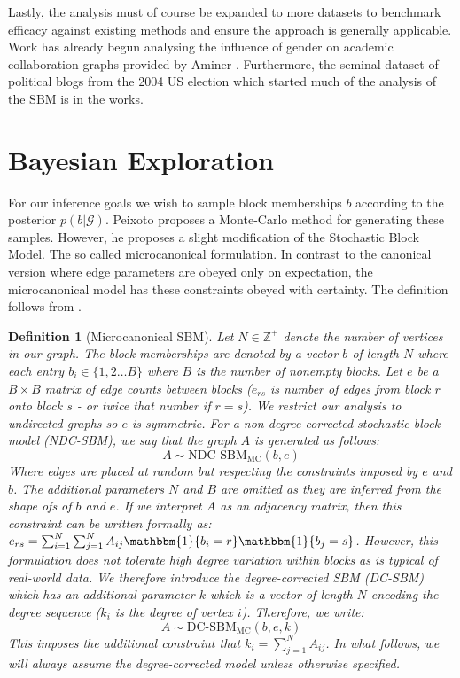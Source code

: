 \documentclass[]{article}
\newcommand{\Gcal}{\mathcal{G}}
\newcommand{\Integers}{\mathbb{Z}}
\newcommand{\one}{\mathbbm{1}}
\newtheorem{definition}{Definition}[section]
\begin{document}
\begin{multicols*}{2}
Lastly, the analysis must of course be expanded to more datasets to benchmark efficacy against existing methods and ensure the approach is generally applicable. Work has already begun analysing the influence of gender on academic collaboration graphs provided by Aminer \cite{aminer}. Furthermore, the seminal dataset of political blogs from the 2004 US election \cite{polblogs} which started much of the analysis of the SBM is in the works.

\section{Bayesian Exploration}

For our inference goals we wish to sample block memberships $b$ according to the posterior $p(b | \Gcal)$. Peixoto \cite{Peixoto-MCMC} proposes a Monte-Carlo method for generating these samples. However, he proposes a slight modification of the Stochastic Block Model. The so called microcanonical formulation. In contrast to the canonical version where edge parameters are obeyed only on expectation, the microcanonical model has these constraints obeyed with certainty. The definition follows from \cite{Peixoto-Bayesian-Microcanonical}.

\begin{definition}[Microcanonical SBM]
	\label{defn:microcan-sbm}
	Let $N \in \Integers^{+}$ denote the number of vertices in our graph. The block memberships are denoted by a vector $b$ of length $N$ where each entry $b_i \in \{1, 2 \dots B\}$ where $B$ is the number of nonempty blocks. Let $e$ be a $B \times B$ matrix of edge counts between blocks ($e_{rs}$ is number of edges from block $r$ onto block $s$ - or twice that number if $r=s$). We restrict our analysis to undirected graphs so $e$ is symmetric. For a non-degree-corrected stochastic block model (NDC-SBM), we say that the graph $A$ is generated as follows:
	\begin{equation}
		A \sim \textrm{NDC-SBM}_{\textrm{MC}} (b, e)
	\end{equation}
	Where edges are placed at random but respecting the constraints imposed by $e$ and $b$. The additional parameters $N$ and $B$ are omitted as they are inferred from the shape ofs of $b$ and $e$. If we interpret $A$ as an adjacency matrix, then this constraint can be written formally as: $e_{rs} = \sum_{i=1}^{N} \sum_{j=1}^{N} A_{ij} \one \{b_i = r\} \one \{b_j = s\}$. However, this formulation does not tolerate high degree variation within blocks as is typical of real-world data. We therefore introduce the degree-corrected SBM (DC-SBM) which has an additional parameter $k$ which is a vector of length $N$ encoding the degree sequence ($k_i$ is the degree of vertex $i$). Therefore, we write:
	\begin{equation}
		A \sim \textrm{DC-SBM}_{\textrm{MC}} (b, e, k)
	\end{equation}
	This imposes the additional constraint that $k_i = \sum_{j=1}^{N} A_{ij}$. In what follows, we will always assume the degree-corrected model unless otherwise specified.
	

\end{definition}
\end{multicols*}
\end{document}
